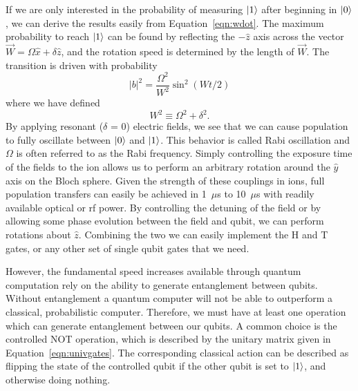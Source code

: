 If we are only interested in the probability of measuring $\left| 1 \right>$ after beginning in $\left| 0 \right>$, we can derive the results easily from Equation~\ref{eqn:wdot}.  The maximum probability to reach $\left| 1 \right>$ can be found by reflecting the $-\hat{z}$ axis across the vector $\vec{W} = \Omega \hat{x} + \delta \hat{z}$, and the rotation speed is determined by the length of $\vec{W}$.  The transition is driven with probability
\begin{equation}
	\left| b \right|^2 = \frac{\Omega^2}{W^2} \sin^2( W t / 2 )
\end{equation}
where we have defined
\begin{equation}
	W^2 \equiv \Omega^2 + \delta^2 \mathrm{.}
\end{equation}
By applying resonant ($\delta$ = 0) electric fields, we see that we can cause population to fully oscillate between $\left| 0 \right>$ and $\left| 1 \right>$.  This behavior is called Rabi oscillation and $\Omega$ is often referred to as the Rabi frequency.  Simply controlling the exposure time of the fields to the ion allows us to perform an arbitrary rotation around the $\hat{y}$ axis on the Bloch sphere.  Given the strength of these couplings in ions, full population transfers can easily be achieved in 1~$\mu$s to 10~$\mu$s with readily available optical or rf power.  By controlling the detuning of the field or by allowing some phase evolution between the field and qubit, we can perform rotations about $\hat{z}$.  Combining the two we can easily implement the H and T gates, or any other set of single qubit gates that we need.

However, the fundamental speed increases available through quantum computation rely on the ability to generate entanglement between qubits.  Without entanglement a quantum computer will not be able to outperform a classical, probabilistic computer.  Therefore, we must have at least one operation which can generate entanglement between our qubits.  A common choice is the controlled NOT operation, which is described by the unitary matrix given in Equation~\ref{eqn:univgates}.  The corresponding classical action can be described as flipping the state of the controlled qubit if the other qubit is set to $\left| 1 \right>$, and otherwise doing nothing.

